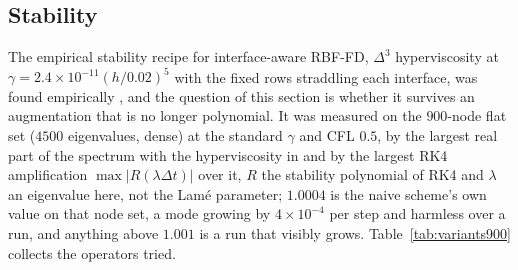 \documentclass[11pt]{amsart}
\theoremstyle{definition}
\theoremstyle{remark}
\newcommand{\sci}[2]{\ensuremath{#1 \times 10^{#2}}}
\newcommand{\tablesetup}{\footnotesize\setlength{\tabcolsep}{2.5pt}%
  \renewcommand{\sci}[2]{\ensuremath{##1{\times}10^{##2}}}}
\begin{document}
\begin{table}
  \caption{Flat edges at normal incidence: relative $\ell^2$ error in
  $v$ at $t = 1$ and the rates between successive node sets, for the
  standard scheme (naive) and the seed operator (the interface-aware
  stencils at $\delta = 0$), with the resolution floor. $h / \delta$
  runs from $8$ to $2.9$ at $\delta = 0.0025$, from $2$ to $0.71$ at
  $0.01$ and from $0.5$ to $0.18$ at $0.04$.}
  \label{tab:flat2d_v}
  \centering
  \tablesetup
  
\end{table}

\begin{table}
  \caption{Flat edges at normal incidence: the largest spurious $|u|$ at
  $t = 1$ (the true $u$ is identically zero) for the runs of
  Table~\ref{tab:flat2d_v}.}
  \label{tab:flat2d_u}
  \centering
  \tablesetup
  
\end{table}

\FloatBarrier
\subsection{Stability}
\label{sec:stability2d}
The empirical stability recipe for interface-aware RBF-FD, $\Delta^3$
hyperviscosity at $\gamma = 2.4 \times 10^{-11} (h / 0.02)^5$ with the
fixed rows straddling each interface, was found empirically
\cite{Martin2016,MartinFornberg2017}, and the question of this section
is whether it survives an augmentation that is no longer polynomial.
It was measured on the $900$-node flat set ($4500$ eigenvalues, dense) at
the standard $\gamma$ and CFL $0.5$, by the largest real part of the
spectrum with the hyperviscosity in and by the largest RK4 amplification
$\max |R(\lambda \Delta t)|$ over it, $R$ the stability polynomial of RK4
and $\lambda$ an eigenvalue here, not the Lam\'e parameter; $1.0004$ is the naive scheme's own
value on that node set, a mode growing by $4 \times 10^{-4}$ per step and
harmless over a run, and anything above $1.001$ is a run that visibly
grows. Table~\ref{tab:variants900} collects the operators tried.
\end{document}
